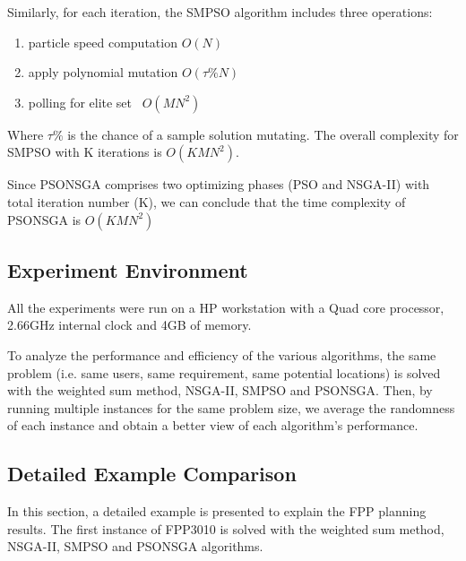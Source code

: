 \documentclass[10pt,journal,compsoc]{IEEEtran}
\begin{document}
Similarly, for each iteration, the SMPSO algorithm includes three operations:
\begin{enumerate}
\item  particle speed computation $O(N)$
\item  apply polynomial mutation $O(\tau\% N)$
\item polling for elite set ~$O(MN^2)$
\end{enumerate}
Where $\tau\%$ is the chance of a sample solution mutating.
The overall complexity for SMPSO with K iterations is $O(KMN^2)$.

Since PSONSGA comprises two optimizing phases (PSO and NSGA-II) with total iteration number (K), we can conclude that the time complexity of PSONSGA is $O(KMN^2)$
\subsection{Experiment Environment}
All the experiments were run on a HP workstation with a Quad core processor, 2.66GHz internal clock and 4GB of memory.  

To analyze the performance and efficiency of the various algorithms, the same problem (i.e. same users, same requirement, same potential locations) is solved with the weighted sum method, NSGA-II, SMPSO and PSONSGA. Then, by running multiple instances for the same problem size, we average the randomness of each instance and obtain a better view of each algorithm's performance.

%

%
\subsection{Detailed Example Comparison}
In this section, a detailed example is presented to explain the FPP planning results. The first instance of FPP3010 is solved with the weighted sum method, NSGA-II, SMPSO and PSONSGA algorithms. 
\end{document}
